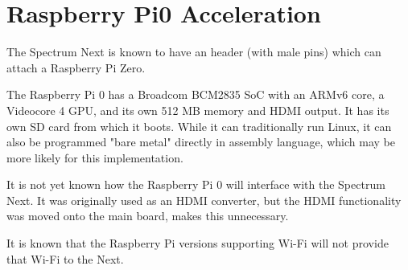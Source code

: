 \chapter{Raspberry Pi0 Acceleration}
The Spectrum Next is known to have an header (with male pins) which
can attach a Raspberry Pi Zero.

The Raspberry Pi 0 has a Broadcom BCM2835 SoC with an ARMv6 core, a
Videocore 4 GPU, and its own 512 MB memory and HDMI output. It has its
own SD card from which it boots. While it can traditionally run Linux,
it can also be programmed "bare metal" directly in assembly language,
which may be more likely for this implementation.

It is not yet known how the Raspberry Pi 0 will interface with the
Spectrum Next. It was originally used as an HDMI converter, but the
HDMI functionality was moved onto the main board, makes this
unnecessary.

It is known that the Raspberry Pi versions supporting Wi-Fi will not
provide that Wi-Fi to the Next.

